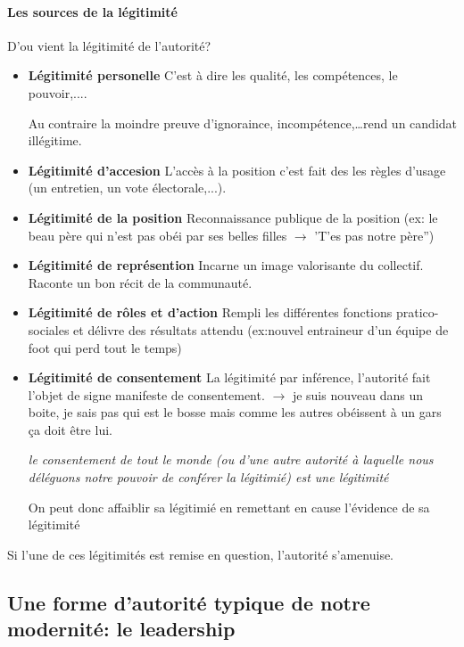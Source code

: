 \documentclass[11pt]{article} %
\begin{document}
\paragraph{Les sources de la légitimité} 

D'ou vient la légitimité de l'autorité? 

\begin{itemize}

 \item \textbf{Légitimité personelle} C'est à dire les qualité, les
compétences, le pouvoir,....

Au contraire la moindre preuve d'ignoraince, incompétence,\ldots rend un
candidat illégitime.
 \item \textbf{Légitimité d'accesion} L'accès à la position c'est fait des
 les règles d'usage (un entretien, un vote électorale,...).

 \item \textbf{Légitimité de la position} Reconnaissance publique de la
 position (ex: le beau père qui n'est pas obéi par ses belles filles
 $\to$ 'T'es pas notre père'')

 \item \textbf{Légitimité de représention} Incarne un image valorisante du
 collectif. Raconte un bon récit de la communauté.

 \item \textbf{Légitimité de rôles et d'action} Rempli les différentes
 fonctions pratico-sociales et délivre des résultats attendu
 (ex:nouvel entraineur d'un équipe de foot qui perd tout le temps)

 \item \textbf{Légitimité de consentement} La légitimité
 par inférence, l'autorité fait l'objet de signe manifeste de
 consentement. 
 $\to$ je suis nouveau dans un boite,
 je sais pas qui est le bosse mais comme les autres obéissent à un
 gars ça doit être lui.

 \textit{le consentement de tout le monde (ou d'une autre
 autorité à laquelle nous déléguons notre pouvoir de conférer la
 légitimié) est une légitimité}

 On peut donc affaiblir sa légitimié en remettant en cause l'évidence de
 sa légitimité

\end{itemize}

Si l'une de ces légitimités est remise en question, l'autorité
s'amenuise.

\subsection{Une forme d'autorité typique de notre modernité: le leadership}
\end{document}
